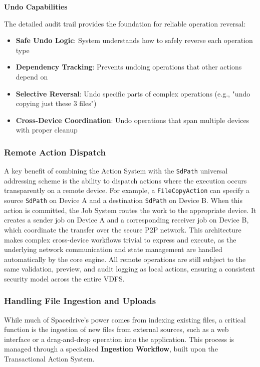 \documentclass[sigconf]{acmart}
\newcommand{\plannedSection}[1]{#1}
\begin{document}
\textbf{\plannedSection{Undo Capabilities}}

The detailed audit trail provides the foundation for reliable operation reversal:

\begin{itemize}[noitemsep, topsep=0pt]
 \item \textbf{Safe Undo Logic}: System understands how to safely reverse each operation type
 \item \textbf{Dependency Tracking}: Prevents undoing operations that other actions depend on
 \item \textbf{Selective Reversal}: Undo specific parts of complex operations (e.g., "undo copying just these 3 files")
 \item \textbf{Cross-Device Coordination}: Undo operations that span multiple devices with proper cleanup
\end{itemize}

\subsubsection{Remote Action Dispatch}

A key benefit of combining the Action System with the \texttt{SdPath} universal addressing scheme is the ability to dispatch actions where the execution occurs transparently on a remote device. For example, a \texttt{FileCopyAction} can specify a source \texttt{SdPath} on Device A and a destination \texttt{SdPath} on Device B. When this action is committed, the Job System routes the work to the appropriate device. It creates a sender job on Device A and a corresponding receiver job on Device B, which coordinate the transfer over the secure P2P network. This architecture makes complex cross-device workflows trivial to express and execute, as the underlying network communication and state management are handled automatically by the core engine. All remote operations are still subject to the same validation, preview, and audit logging as local actions, ensuring a consistent security model across the entire VDFS.

\subsubsection{Handling File Ingestion and Uploads}
\label{sec:ingestion-workflow}
While much of Spacedrive's power comes from indexing existing files, a critical function is the ingestion of new files from external sources, such as a web interface or a drag-and-drop operation into the application. This process is managed through a specialized \textbf{Ingestion Workflow}, built upon the Transactional Action System.
\end{document}
